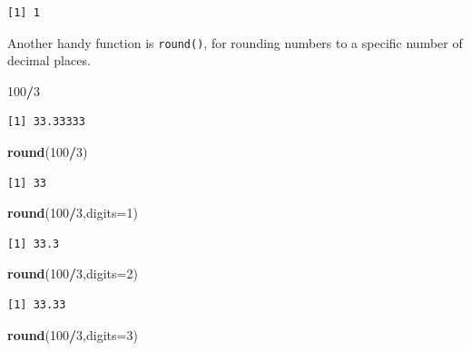 \documentclass[
]{book}
\newenvironment{Shaded}{\begin{snugshade}}{\end{snugshade}}
\newcommand{\DataTypeTok}[1]{\textcolor[rgb]{0.13,0.29,0.53}{#1}}
\newcommand{\DecValTok}[1]{\textcolor[rgb]{0.00,0.00,0.81}{#1}}
\newcommand{\KeywordTok}[1]{\textcolor[rgb]{0.13,0.29,0.53}{\textbf{#1}}}
\newcommand{\NormalTok}[1]{#1}
\newcommand{\OperatorTok}[1]{\textcolor[rgb]{0.81,0.36,0.00}{\textbf{#1}}}
\begin{document}
\begin{verbatim}
[1] 1
\end{verbatim}

Another handy function is \texttt{round()}, for rounding numbers to a specific number of decimal places.

\begin{Shaded}
\begin{Highlighting}[]
\DecValTok{100}\OperatorTok{/}\DecValTok{3}
\end{Highlighting}
\end{Shaded}

\begin{verbatim}
[1] 33.33333
\end{verbatim}

\begin{Shaded}
\begin{Highlighting}[]
\KeywordTok{round}\NormalTok{(}\DecValTok{100}\OperatorTok{/}\DecValTok{3}\NormalTok{)}
\end{Highlighting}
\end{Shaded}

\begin{verbatim}
[1] 33
\end{verbatim}

\begin{Shaded}
\begin{Highlighting}[]
\KeywordTok{round}\NormalTok{(}\DecValTok{100}\OperatorTok{/}\DecValTok{3}\NormalTok{,}\DataTypeTok{digits=}\DecValTok{1}\NormalTok{)}
\end{Highlighting}
\end{Shaded}

\begin{verbatim}
[1] 33.3
\end{verbatim}

\begin{Shaded}
\begin{Highlighting}[]
\KeywordTok{round}\NormalTok{(}\DecValTok{100}\OperatorTok{/}\DecValTok{3}\NormalTok{,}\DataTypeTok{digits=}\DecValTok{2}\NormalTok{)}
\end{Highlighting}
\end{Shaded}

\begin{verbatim}
[1] 33.33
\end{verbatim}

\begin{Shaded}
\begin{Highlighting}[]
\KeywordTok{round}\NormalTok{(}\DecValTok{100}\OperatorTok{/}\DecValTok{3}\NormalTok{,}\DataTypeTok{digits=}\DecValTok{3}\NormalTok{)}
\end{Highlighting}
\end{Shaded}
\end{document}
